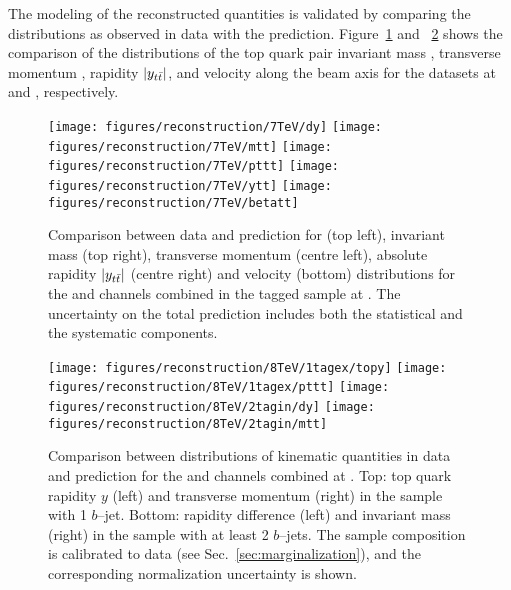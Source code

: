 The modeling of the reconstructed quantities is validated by comparing
the distributions as observed in data with the prediction. 
Figure~\ref{fig:datamcreco2011} and ~\ref{fig:datamcreco2012}
shows the comparison of the distributions of
the top quark pair invariant mass \mtt{}, transverse momentum \pttt{},
rapidity $|y_{t\bar{t}}{}|$, and velocity along the beam axis \betatt{} for the
datasets at \seventev{} and \eighttev{}, respectively.
%                                   
\begin{figure}[!htb]\centering
  \texttt{[image: figures/reconstruction/7TeV/dy]}
  \texttt{[image: figures/reconstruction/7TeV/mtt]}
  \texttt{[image: figures/reconstruction/7TeV/pttt]}
  \texttt{[image: figures/reconstruction/7TeV/ytt]}
  \texttt{[image: figures/reconstruction/7TeV/betatt]}
  \caption{Comparison between data and prediction for \dy{} (top
    left), invariant mass \mtt{} (top right), transverse momentum
    \pttt{} (centre left), absolute rapidity $|y_{t\bar{t}}{}|$ (centre right)
    and velocity \betatt{} (bottom) distributions for the \ejets{} and
    \mujets{} channels combined in the tagged sample at
    \seventev{}. The uncertainty on the total prediction includes both
    the statistical and the systematic components.} 
  \label{fig:datamcreco2011}
\end{figure}
%
\begin{figure}[!htb]\centering
  \texttt{[image: figures/reconstruction/8TeV/1tagex/topy]}
  \texttt{[image: figures/reconstruction/8TeV/1tagex/pttt]}
  \texttt{[image: figures/reconstruction/8TeV/2tagin/dy]}
  \texttt{[image: figures/reconstruction/8TeV/2tagin/mtt]}
  \caption{Comparison between distributions of kinematic quantities in
    data and prediction for the \ejets{} and \mujets{} channels
    combined at \eighttev{}. Top: top quark rapidity $y$ (left) and
    transverse momentum \pttt{} (right) in the sample with 1 $b$--jet.
    Bottom: rapidity difference \dy{} (left) and invariant mass \mtt{}
    (right) in the sample with at least 2 $b$--jets.
    The sample composition is calibrated to data (see
    Sec.~\ref{sec:marginalization}), and the corresponding normalization
    uncertainty is shown.} 
  \label{fig:datamcreco2012}
\end{figure}
%

